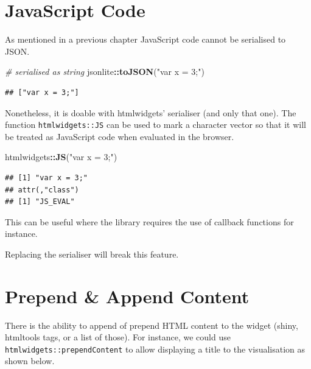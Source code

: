 \documentclass[
]{krantz}
\makeatletter
\newenvironment{Shaded}{\begin{snugshade}}{\end{snugshade}}
\newcommand{\CommentTok}[1]{\textcolor[rgb]{0.37,0.37,0.37}{\textit{#1}}}
\newcommand{\KeywordTok}[1]{\textcolor[rgb]{0.27,0.27,0.27}{\textbf{#1}}}
\newcommand{\NormalTok}[1]{#1}
\newcommand{\OperatorTok}[1]{\textcolor[rgb]{0.43,0.43,0.43}{\textbf{#1}}}
\newcommand{\StringTok}[1]{\textcolor[rgb]{0.5,0.5,0.5}{#1}}
\newenvironment{kframe}{%
\medskip{}
\setlength{\fboxsep}{.8em}
 \def\at@end@of@kframe{}%
 \ifinner\ifhmode%
  \def\at@end@of@kframe{\end{minipage}}%
  \begin{minipage}{\columnwidth}%
 \fi\fi%
 \def\FrameCommand##1{\hskip\@totalleftmargin \hskip-\fboxsep
 \colorbox{shadecolor}{##1}\hskip-\fboxsep
     \hskip-\linewidth \hskip-\@totalleftmargin \hskip\columnwidth}%
 \MakeFramed {\advance\hsize-\width
   \@totalleftmargin\z@ \linewidth\hsize
   \@setminipage}}%
 {\par\unskip\endMakeFramed%
 \at@end@of@kframe}
\renewenvironment{Shaded}{\begin{kframe}}{\end{kframe}}
\newenvironment{rmdblock}[1]
  {
  \begin{itemize}
  \renewcommand{\labelitemi}{
    \raisebox{-.7\height}[0pt][0pt]{
      {\setkeys{Gin}{width=3em,keepaspectratio}\texttt{[image: images/\#1]}}
    }
  }
  \setlength{\fboxsep}{1em}
  \begin{kframe}
  \item
  }
  {
  \end{kframe}
  \end{itemize}
  }
\newenvironment{rmdnote}
  {\begin{rmdblock}{note}}
  {\end{rmdblock}}
\makeatother
\begin{document}
\hypertarget{javascript-code}{%
\section{JavaScript Code}\label{javascript-code}}

As mentioned in a previous chapter JavaScript code cannot be serialised to JSON.

\begin{Shaded}
\begin{Highlighting}[]
\CommentTok{\# serialised as string}
\NormalTok{jsonlite}\OperatorTok{::}\KeywordTok{toJSON}\NormalTok{(}\StringTok{"var x = 3;"}\NormalTok{)}
\end{Highlighting}
\end{Shaded}

\begin{verbatim}
## ["var x = 3;"]
\end{verbatim}

Nonetheless, it is doable with htmlwidgets' serialiser (and only that one). The function \texttt{htmlwidgets::JS} can be used to mark a character vector so that it will be treated as JavaScript code when evaluated in the browser.

\begin{Shaded}
\begin{Highlighting}[]
\NormalTok{htmlwidgets}\OperatorTok{::}\KeywordTok{JS}\NormalTok{(}\StringTok{"var x = 3;"}\NormalTok{)  }
\end{Highlighting}
\end{Shaded}

\begin{verbatim}
## [1] "var x = 3;"
## attr(,"class")
## [1] "JS_EVAL"
\end{verbatim}

This can be useful where the library requires the use of callback functions for instance.

\begin{rmdnote}
Replacing the serialiser will break this feature.
\end{rmdnote}

\hypertarget{prepend-append-content}{%
\section{Prepend \& Append Content}\label{prepend-append-content}}

There is the ability to append of prepend HTML content to the widget (shiny, htmltools tags, or a list of those). For instance, we could use \texttt{htmlwidgets::prependContent} to allow displaying a title to the visualisation as shown below.
\end{document}
